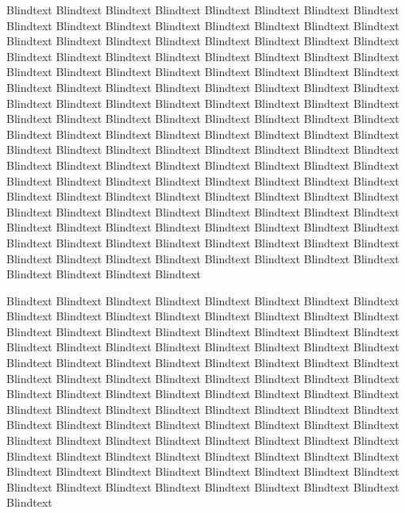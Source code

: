 Blindtext Blindtext Blindtext Blindtext Blindtext Blindtext Blindtext
Blindtext Blindtext Blindtext Blindtext Blindtext Blindtext Blindtext
Blindtext Blindtext Blindtext Blindtext Blindtext Blindtext Blindtext
Blindtext Blindtext Blindtext Blindtext Blindtext Blindtext Blindtext
Blindtext Blindtext Blindtext Blindtext Blindtext Blindtext Blindtext
Blindtext Blindtext Blindtext Blindtext Blindtext Blindtext Blindtext
Blindtext Blindtext Blindtext Blindtext Blindtext Blindtext Blindtext
Blindtext Blindtext Blindtext Blindtext Blindtext Blindtext Blindtext
Blindtext Blindtext Blindtext Blindtext Blindtext Blindtext Blindtext
Blindtext Blindtext Blindtext Blindtext Blindtext Blindtext Blindtext
Blindtext Blindtext Blindtext Blindtext Blindtext Blindtext Blindtext
Blindtext Blindtext Blindtext Blindtext Blindtext Blindtext Blindtext
Blindtext Blindtext Blindtext Blindtext Blindtext Blindtext Blindtext
Blindtext Blindtext Blindtext Blindtext Blindtext Blindtext Blindtext
Blindtext Blindtext Blindtext Blindtext Blindtext Blindtext Blindtext
Blindtext Blindtext Blindtext Blindtext Blindtext Blindtext Blindtext
Blindtext Blindtext Blindtext Blindtext Blindtext Blindtext Blindtext
Blindtext Blindtext Blindtext Blindtext Blindtext Blindtext Blindtext
Blindtext Blindtext Blindtext Blindtext Blindtext Blindtext Blindtext
Blindtext Blindtext Blindtext Blindtext Blindtext Blindtext Blindtext

Blindtext Blindtext Blindtext Blindtext Blindtext Blindtext Blindtext
Blindtext Blindtext Blindtext Blindtext Blindtext Blindtext Blindtext
Blindtext Blindtext Blindtext Blindtext Blindtext Blindtext Blindtext
Blindtext Blindtext Blindtext Blindtext Blindtext Blindtext Blindtext
Blindtext Blindtext Blindtext Blindtext Blindtext Blindtext Blindtext
Blindtext Blindtext Blindtext Blindtext Blindtext Blindtext Blindtext
Blindtext Blindtext Blindtext Blindtext Blindtext Blindtext Blindtext
Blindtext Blindtext Blindtext Blindtext Blindtext Blindtext Blindtext
Blindtext Blindtext Blindtext Blindtext Blindtext Blindtext Blindtext
Blindtext Blindtext Blindtext Blindtext Blindtext Blindtext Blindtext
Blindtext Blindtext Blindtext Blindtext Blindtext Blindtext Blindtext
Blindtext Blindtext Blindtext Blindtext Blindtext Blindtext Blindtext
Blindtext Blindtext Blindtext Blindtext Blindtext Blindtext Blindtext
Blindtext Blindtext Blindtext Blindtext Blindtext Blindtext Blindtext
Blindtext Blindtext Blindtext Blindtext Blindtext Blindtext Blindtext

